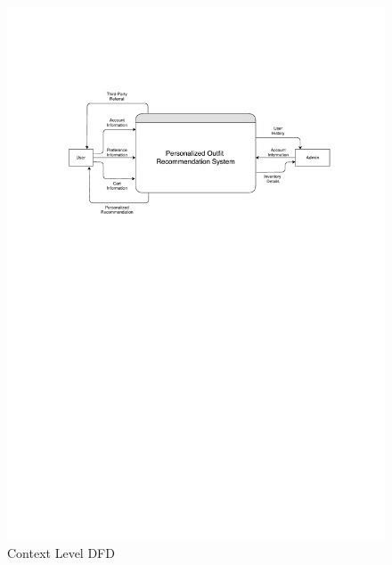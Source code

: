 \begin{figure}[ht]
\includegraphics[width=15cm]{images/dfdContext.pdf} 
\centering
\caption{Context Level DFD}
\end{figure}

